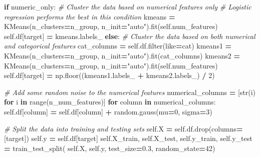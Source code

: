 \documentclass[
]{book}
\newenvironment{Shaded}{\begin{snugshade}}{\end{snugshade}}
\newcommand{\BuiltInTok}[1]{#1}
\newcommand{\CommentTok}[1]{\textcolor[rgb]{0.56,0.35,0.01}{\textit{#1}}}
\newcommand{\ControlFlowTok}[1]{\textcolor[rgb]{0.13,0.29,0.53}{\textbf{#1}}}
\newcommand{\DecValTok}[1]{\textcolor[rgb]{0.00,0.00,0.81}{#1}}
\newcommand{\FloatTok}[1]{\textcolor[rgb]{0.00,0.00,0.81}{#1}}
\newcommand{\KeywordTok}[1]{\textcolor[rgb]{0.13,0.29,0.53}{\textbf{#1}}}
\newcommand{\NormalTok}[1]{#1}
\newcommand{\OperatorTok}[1]{\textcolor[rgb]{0.81,0.36,0.00}{\textbf{#1}}}
\newcommand{\StringTok}[1]{\textcolor[rgb]{0.31,0.60,0.02}{#1}}
\newcommand{\VariableTok}[1]{\textcolor[rgb]{0.00,0.00,0.00}{#1}}
\theoremstyle{definition}
\theoremstyle{definition}
\theoremstyle{definition}
\theoremstyle{definition}
\theoremstyle{remark}
\begin{document}
\begin{Shaded}
\begin{Highlighting}[]
        \ControlFlowTok{if}\NormalTok{ numeric\_only:}
            \CommentTok{\# Cluster the data based on numerical features only}
            \CommentTok{\# Logistic regression performs the best in this condition}
\NormalTok{            kmeans }\OperatorTok{=}\NormalTok{ KMeans(n\_clusters}\OperatorTok{=}\NormalTok{n\_group, n\_init}\OperatorTok{=}\StringTok{"auto"}\NormalTok{).fit(}\VariableTok{self}\NormalTok{.num\_features)}
            \VariableTok{self}\NormalTok{.df[}\StringTok{\textquotesingle{}target\textquotesingle{}}\NormalTok{] }\OperatorTok{=}\NormalTok{ kmeans.labels\_}
        \ControlFlowTok{else}\NormalTok{:}
            \CommentTok{\# Cluster the data based on both numerical and categorical features}
\NormalTok{            cat\_columns }\OperatorTok{=} \VariableTok{self}\NormalTok{.df.}\BuiltInTok{filter}\NormalTok{(like}\OperatorTok{=}\StringTok{\textquotesingle{}cat\textquotesingle{}}\NormalTok{)}
\NormalTok{            kmeans1 }\OperatorTok{=}\NormalTok{ KMeans(n\_clusters}\OperatorTok{=}\NormalTok{n\_group, n\_init}\OperatorTok{=}\StringTok{"auto"}\NormalTok{).fit(cat\_columns)}
\NormalTok{            kmeans2 }\OperatorTok{=}\NormalTok{ KMeans(n\_clusters}\OperatorTok{=}\NormalTok{n\_group, n\_init}\OperatorTok{=}\StringTok{"auto"}\NormalTok{).fit(}\VariableTok{self}\NormalTok{.num\_features)}
            \VariableTok{self}\NormalTok{.df[}\StringTok{\textquotesingle{}target\textquotesingle{}}\NormalTok{] }\OperatorTok{=}\NormalTok{ np.floor((kmeans1.labels\_ }\OperatorTok{+}\NormalTok{ kmeans2.labels\_) }\OperatorTok{/} \DecValTok{2}\NormalTok{)}

        \CommentTok{\# Add some random noise to the numerical features}
\NormalTok{        numerical\_columns }\OperatorTok{=}\NormalTok{ [}\BuiltInTok{str}\NormalTok{(i) }\ControlFlowTok{for}\NormalTok{ i }\KeywordTok{in} \BuiltInTok{range}\NormalTok{(n\_num\_features)]}
        \ControlFlowTok{for}\NormalTok{ column }\KeywordTok{in}\NormalTok{ numerical\_columns:}
            \VariableTok{self}\NormalTok{.df[column] }\OperatorTok{=} \VariableTok{self}\NormalTok{.df[column] }\OperatorTok{+}\NormalTok{ random.gauss(mu}\OperatorTok{=}\DecValTok{0}\NormalTok{, sigma}\OperatorTok{=}\DecValTok{3}\NormalTok{)}

        \CommentTok{\# Split the data into training and testing sets}
        \VariableTok{self}\NormalTok{.X }\OperatorTok{=} \VariableTok{self}\NormalTok{.df.drop(columns}\OperatorTok{=}\NormalTok{[}\StringTok{\textquotesingle{}target\textquotesingle{}}\NormalTok{])}
        \VariableTok{self}\NormalTok{.y }\OperatorTok{=} \VariableTok{self}\NormalTok{.df[}\StringTok{\textquotesingle{}target\textquotesingle{}}\NormalTok{]}
        \VariableTok{self}\NormalTok{.X\_train, }\VariableTok{self}\NormalTok{.X\_test, }\VariableTok{self}\NormalTok{.y\_train, }\VariableTok{self}\NormalTok{.y\_test }\OperatorTok{=}\NormalTok{ train\_test\_split(}
            \VariableTok{self}\NormalTok{.X, }\VariableTok{self}\NormalTok{.y, test\_size}\OperatorTok{=}\FloatTok{0.3}\NormalTok{, random\_state}\OperatorTok{=}\DecValTok{42}\NormalTok{)}


\end{Highlighting}
\end{Shaded}
\end{document}
